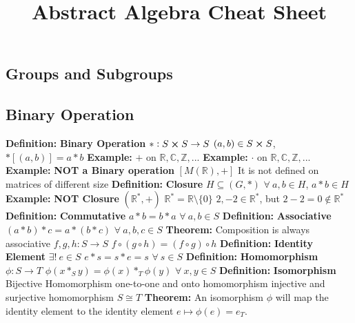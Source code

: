 \documentclass[14pt]{extarticle}
\title{Abstract Algebra Cheat Sheet}
\def\Definition{{\color{blue} \textbf{Definition:} }}
\def\Theorem{{\color{red} \textbf{Theorem:} }}
\def\Example{{\color{violet} \textbf{Example:} }}
\begin{document}
	\maketitle	
	\begin{outline}	
		\section*{Groups and Subgroups}

		\subsection*{Binary Operation}
		\1	\Definition \textbf{Binary Operation}
			\2	$* : S \cross S \rightarrow S$
			\2	$(a,b) \in S \cross S$, $*[(a,b)] = a * b$
			\2	\Example $+$ on $\mathbb{R},\mathbb{C},\mathbb{Z},...$
			\2	\Example $\cdot$ on $\mathbb{R},\mathbb{C},\mathbb{Z},...$	
			\2	\Example \textbf{NOT a Binary operation} $[M(\mathbb{R}),+]$
				\3	It is not defined on matrices of different size
		\1	\Definition \textbf{Closure}
			\2	$H \subseteq (G,*)$
			\2	$\forall~a,b \in H$, $a*b \in H$
			\2	\Example \textbf{NOT Closure} $(\mathbb{R}^*,+)$
				\3	$\mathbb{R}^* = \mathbb{R} \setminus \{0\}$
				\3	$2,-2 \in \mathbb{R}^*$, but $2 - 2 = 0 \notin \mathbb{R}^*$
		\1	\Definition \textbf{Commutative}
			\2	$a*b = b*a$ $\forall~a,b \in S$
		\1	\Definition \textbf{Associative}
			\2	$(a*b)*c = a*(b*c)$ $\forall~a,b,c \in S$
		\1	\Theorem Composition is always associative
			\2	$f,g,h : S \rightarrow S$
			\2	$f \circ (g \circ h) = (f \circ g) \circ h$
		\1	\Definition \textbf{Identity Element}
			\2	$\exists!~e \in S$
			\2	$e*s = s*e = s$ $\forall~s \in S$
		\1	\Definition \textbf{Homomorphism}
			\2	$\phi : S \rightarrow T$
			\2	$\phi(x *_S y) = \phi(x) *_T \phi(y)$ $\forall~x,y \in S$
		\1	\Definition \textbf{Isomorphism}
			\2	Bijective Homomorphism
			\2	one-to-one and onto homomorphism
			\2	injective and surjective homomorphism
			\2	$S \cong T$
		\1	\Theorem An isomorphism $\phi$ will map the identity element to the identity
								element	$e \mapsto \phi(e) = e_T$.

\end{outline}
\end{document}

